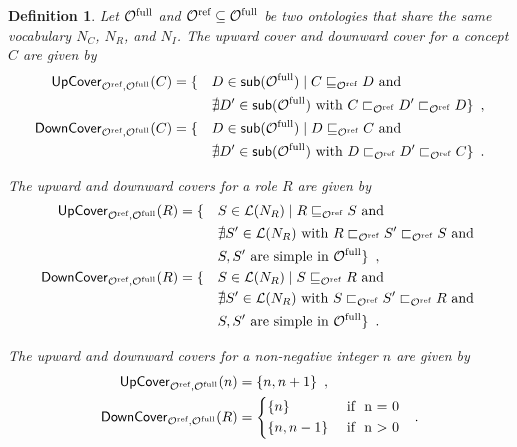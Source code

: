 \documentclass[
]{ceurart}
\newtheorem{definition}{Definition}
\begin{document}
\begin{definition} \label{def:covers}
  Let ${\mathcal{O}^\textnormal{full}}$ and ${\mathcal{O}^\textnormal{ref}} \subseteq {\mathcal{O}^\textnormal{full}}$ be two \SROIQ ontologies that share the same vocabulary $N_C$, $N_R$, and $N_I$. The \emph{upward cover} and \emph{downward cover} for a concept $C$ are given by
  {\footnotesize
  \begin{alignat*}{2}
    {\ensuremath{\mathsf{UpCover}}}_{{\mathcal{O}^\textnormal{ref}},{\mathcal{O}^\textnormal{full}}}(C) &= \{ &&D \in \mathop{\mathsf{sub}}({\mathcal{O}^\textnormal{full}}) \mid C \sqsubseteq_{\mathcal{O}^\textnormal{ref}} D \text{ and } \\
    &&&\nexists D' \in \mathop{\mathsf{sub}}({\mathcal{O}^\textnormal{full}}) \text{ with } C \sqsubset_{\mathcal{O}^\textnormal{ref}} D' \sqsubset_{\mathcal{O}^\textnormal{ref}} D \} \enspace, \\
    {\mathsf{DownCover}}_{{\mathcal{O}^\textnormal{ref}},{\mathcal{O}^\textnormal{full}}}(C) &= \{ &&D \in \mathop{\mathsf{sub}}({\mathcal{O}^\textnormal{full}}) \mid D \sqsubseteq_{\mathcal{O}^\textnormal{ref}} C \text{ and } \\
    &&&\nexists D' \in \mathop{\mathsf{sub}}({\mathcal{O}^\textnormal{full}}) \text{ with } D \sqsubset_{\mathcal{O}^\textnormal{ref}} D' \sqsubset_{\mathcal{O}^\textnormal{ref}} C \} \enspace.
  \end{alignat*}
  }

  The upward and downward covers for a role $R$ are given by
  {\footnotesize
  \begin{alignat*}{2}
    {\ensuremath{\mathsf{UpCover}}}_{{\mathcal{O}^\textnormal{ref}},{\mathcal{O}^\textnormal{full}}}(R) &= \{ &&S \in \mathcal{L}(N_R) \mid R \sqsubseteq_{\mathcal{O}^\textnormal{ref}} S \text{ and } \\
    &&& \nexists S' \in \mathcal{L}(N_R) \text{ with } R \sqsubset_{\mathcal{O}^\textnormal{ref}} S' \sqsubset_{\mathcal{O}^\textnormal{ref}} S \text{ and } \\
    &&& S, S' \text{ are simple in } {\mathcal{O}^\textnormal{full}} \} \enspace, \\
    {\mathsf{DownCover}}_{{\mathcal{O}^\textnormal{ref}},{\mathcal{O}^\textnormal{full}}}(R) &= \{ &&S \in \mathcal{L}(N_R) \mid S \sqsubseteq_{\mathcal{O}^\textnormal{ref}} R \text{ and } \\
    &&&\nexists S' \in \mathcal{L}(N_R) \text{ with } S \sqsubset_{\mathcal{O}^\textnormal{ref}} S' \sqsubset_{\mathcal{O}^\textnormal{ref}} R \text{ and } \\
    &&& S, S' \text{ are simple in } {\mathcal{O}^\textnormal{full}} \} \enspace.
  \end{alignat*}
  }

  The upward and downward covers for a non-negative integer $n$ are given by
  {\footnotesize
  \begin{alignat*}{2}
    \UpC_{\Omcref,\Omcfull}(n) &= \{ n, n + 1 \} \enspace, \\
    \DownC_{\Omcref,\Omcfull}(R) &=
    \begin{cases*}
      \{ n \} & \text{ if } n = 0 \\
      \{ n, n - 1 \} & \text{ if } n > 0
    \end{cases*} \enspace.
  \end{alignat*}
  }
\end{definition}
\end{document}

